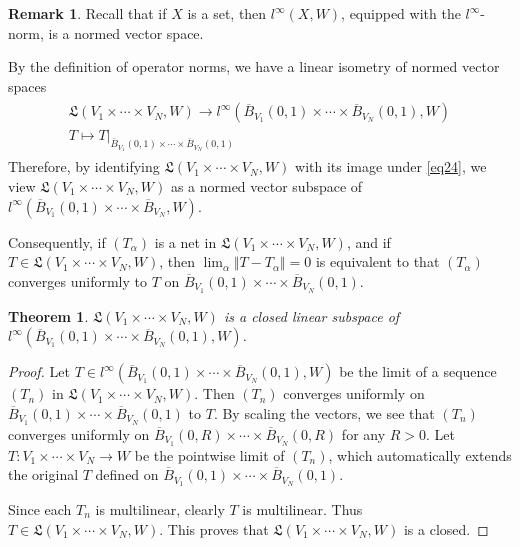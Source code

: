 \documentclass[12pt,b5paper,notitlepage]{article}
\theoremstyle{definition}
\newtheorem{rem}[df]{Remark}
\theoremstyle{plain}
\newtheorem{thm}[df]{Theorem}
\newcommand{\fk}{\mathfrak}
\newcommand{\ovl}{\overline}
\newcommand{\hqed}{\hfill\qedsymbol}
\numberwithin{equation}{section}
\begin{document}
\begin{rem}\label{lb36}
Recall that if $X$ is a set, then $l^\infty(X,W)$, equipped with the $l^\infty$-norm, is a normed vector space.

By the definition of operator norms, we have a linear isometry of normed vector spaces
\begin{gather}\label{eq24}
\begin{gathered}
\fk L(V_1\times\cdots\times V_N,W)\rightarrow l^\infty(\ovl B_{V_1}(0,1)\times\cdots\times\ovl B_{V_N}(0,1),W)\\
T\mapsto T|_{\ovl B_{V_1}(0,1)\times\cdots\times\ovl B_{V_N}(0,1)}
\end{gathered}
\end{gather}
Therefore, by identifying $\fk L(V_1\times\cdots\times V_N,W)$ with its image under \eqref{eq24}, we view $\fk L(V_1\times\cdots\times V_N,W)$ as a normed vector subspace of $l^\infty(\ovl B_{V_1}(0,1)\times\cdots\times\ovl B_{V_N},W)$. 

Consequently, if $(T_\alpha)$ is a net in $\fk L(V_1\times\cdots\times V_N,W)$, and if $T\in\fk L(V_1\times\cdots\times V_N,W)$, then $\lim_\alpha\Vert T-T_\alpha\Vert=0$ is equivalent to that $(T_\alpha)$ converges uniformly to $T$ on $\ovl B_{V_1}(0,1)\times\cdots\times\ovl B_{V_N}(0,1)$.  \hqed
\end{rem}




\begin{thm}\label{lb37}
$\fk L(V_1\times\cdots\times V_N,W)$ is a closed linear subspace of $l^\infty(\ovl B_{V_1}(0,1)\times\cdots\times\ovl B_{V_N}(0,1),W)$. 
\end{thm}

\begin{proof}
Let $T\in l^\infty(\ovl B_{V_1}(0,1)\times\cdots\times\ovl B_{V_N}(0,1),W)$ be the limit of a sequence $(T_n)$ in $\fk L(V_1\times\cdots\times V_N,W)$. Then $(T_n)$ converges uniformly on $\ovl B_{V_1}(0,1)\times\cdots\times\ovl B_{V_N}(0,1)$ to $T$. By scaling the vectors, we see that $(T_n)$ converges uniformly on $\ovl B_{V_1}(0,R)\times\cdots\times\ovl B_{V_N}(0,R)$ for any $R>0$. Let $T:V_1\times\cdots\times V_N\rightarrow W$ be the pointwise limit of $(T_n)$, which automatically extends the original $T$ defined on $\ovl B_{V_1}(0,1)\times\cdots\times\ovl B_{V_N}(0,1)$.

Since each $T_n$ is multilinear, clearly $T$ is multilinear. Thus $T\in\fk L(V_1\times\cdots\times V_N,W)$. This proves that $\fk L(V_1\times\cdots\times V_N,W)$ is a closed.
\end{proof}
\end{document}
